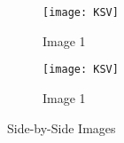 \documentclass{article}
\begin{document}
	\begin{figure}[h]
		\centering
		\begin{subfigure}[b]{0.45\textwidth}
			\centering
			\texttt{[image: KSV]}
			\caption{Image 1}
			\label{fig:image1}
		\end{subfigure}
		
		\begin{subfigure}[b]{0.45\textwidth}
			\centering
			\texttt{[image: KSV]}
			\caption{Image 1}
			\label{fig:image1}
		\end{subfigure}
		\caption{Side-by-Side Images}
	\end{figure}
\end{document}
